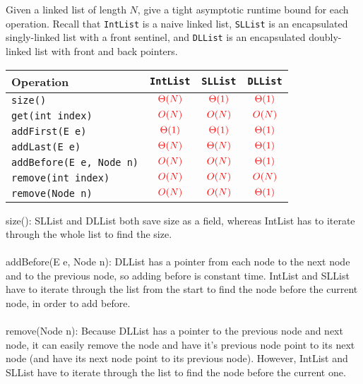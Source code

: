 \begin{blocksection}
\question

Given a linked list of length $N$, give a tight asymptotic runtime
bound for each operation. Recall that \lstinline$IntList$ is a naive linked
list, \lstinline$SLList$ is an encapsulated singly-linked list with a front
sentinel, and \lstinline$DLList$ is an encapsulated doubly-linked list with
front and back pointers.
\end{blocksection}
\ifprintanswers
{
\renewcommand{\arraystretch}{2}
\setlength{\tabcolsep}{16pt}
\begin{tabularx}{\textwidth}{Xccc}
Operation                          & \lstinline$IntList$    & \lstinline$SLList$     & \lstinline$DLList$     \\ \hline
\lstinline$size()$                 & $\color{red}\Theta(N)$ & $\color{red}\Theta(1)$ & $\color{red}\Theta(1)$ \\
\lstinline$get(int index)$         & $\color{red}O(N)$      & $\color{red}O(N)$      & $\color{red}O(N)$      \\
\lstinline$addFirst(E e)$          & $\color{red}\Theta(1)$ & $\color{red}\Theta(1)$ & $\color{red}\Theta(1)$ \\
\lstinline$addLast(E e)$           & $\color{red}\Theta(N)$ & $\color{red}\Theta(N)$ & $\color{red}\Theta(1)$ \\
\lstinline$addBefore(E e, Node n)$ & $\color{red}O(N)$      & $\color{red}O(N)$      & $\color{red}\Theta(1)$ \\
\lstinline$remove(int index)$      & $\color{red}O(N)$      & $\color{red}O(N)$      & $\color{red}O(N)$      \\
\lstinline$remove(Node n)$         & $\color{red}O(N)$      & $\color{red}O(N)$      & $\color{red}\Theta(1)$ \\
\end{tabularx}

\color{red} size(): SLList and DLList both save size as a field, whereas IntList has to iterate through the whole list to find the size. \\\\
addBefore(E e, Node n): DLList has a pointer from each node to the next node and to the previous node, so adding before is constant time. IntList and SLList  have to iterate through the list from the start to find the node before the current node, in order to add before. \\\\
remove(Node n): Because DLList has a pointer to the previous node and next node, it can easily remove the node and have it's previous node point to its next node (and have its next node point to its previous node). However, IntList and SLList have to iterate through the list to find the node before the current one.\\

}
